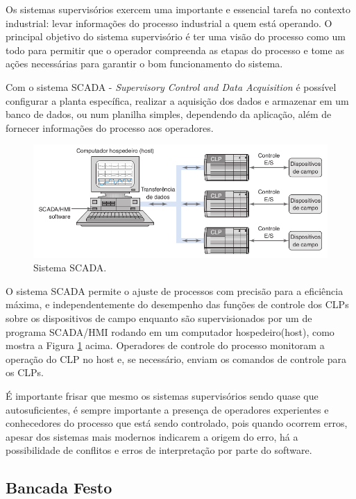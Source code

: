\documentclass[a4paper, 12pt]{article}
\begin{document}
		Os sistemas supervisórios exercem uma importante e essencial tarefa no contexto
		industrial: levar informações do processo industrial a quem está operando.
		O principal objetivo do sistema supervisório é ter uma visão do processo como um
		todo para permitir que o operador compreenda as etapas do processo e tome as ações
		necessárias para garantir o bom funcionamento do sistema.
		
		Com o sistema SCADA - \textit{Supervisory Control and Data Acquisition} é possível
		configurar a planta específica, realizar a aquisição dos dados e armazenar em um
		banco de dados, ou num planilha simples, dependendo da aplicação, além de fornecer
		informações do processo aos operadores.
		
		\begin{figure}[H]
			\centering
			\includegraphics[scale=0.5]{figures/SCADA.png}
			\caption{Sistema SCADA.}
			\label{fig:scada}
		\end{figure}
		
		O sistema SCADA permite o ajuste de processos com precisão para a eficiência máxima, e
		independentemente do desempenho das funções de controle dos CLPs sobre os dispositivos
		de campo enquanto são supervisionados por um de programa SCADA/HMI rodando em um computador
		hospedeiro(host), como mostra a Figura \ref{fig:scada} acima. Operadores de controle do processo monitoram
		a operação do CLP no host e, se necessário, enviam os comandos de controle para os CLPs.
		
		É importante frisar que mesmo os sistemas supervisórios sendo quase que autosuficientes, é sempre
		importante a presença de operadores experientes e conhecedores do processo que está sendo controlado,
		pois quando ocorrem erros, apesar dos sistemas mais modernos indicarem a origem do erro, 
		há a possibilidade de conflitos e erros de interpretação por parte do software.

	\subsection{Bancada Festo}
	
\end{document}
